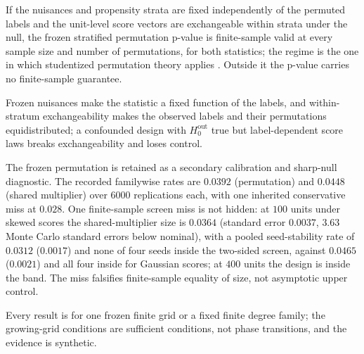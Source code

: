\begin{theorem}
\label{thm:mult-permutation}
If the nuisances and propensity strata are fixed independently of the permuted labels and the unit-level score vectors are exchangeable within strata under the null, the frozen stratified permutation p-value is finite-sample valid at every sample size and number of permutations, for both statistics; the regime is the one in which studentized permutation theory applies \cite{chung_romano_2013,janssen_1997}. Outside it the p-value carries no finite-sample guarantee.
\end{theorem}
Frozen nuisances make the statistic a fixed function of the labels, and within-stratum exchangeability makes the observed labels and their permutations equidistributed; a confounded design with $H_0^{\mathrm{out}}$ true but label-dependent score laws breaks exchangeability and loses control.

The frozen permutation is retained as a secondary calibration and sharp-null diagnostic. The recorded familywise rates are $0.0392$ (permutation) and $0.0448$ (shared multiplier) over $6000$ replications each, with one inherited conservative miss at $0.028$. One finite-sample screen miss is not hidden: at $100$ units under skewed scores the shared-multiplier size is $0.0364$ (standard error $0.0037$, $3.63$ Monte Carlo standard errors below nominal), with a pooled seed-stability rate of $0.0312$ ($0.0017$) and none of four seeds inside the two-sided screen, against $0.0465$ ($0.0021$) and all four inside for Gaussian scores; at $400$ units the design is inside the band. The miss falsifies finite-sample equality of size, not asymptotic upper control.

Every result is for one frozen finite grid or a fixed finite degree family; the growing-grid conditions are sufficient conditions, not phase transitions, and the evidence is synthetic.
